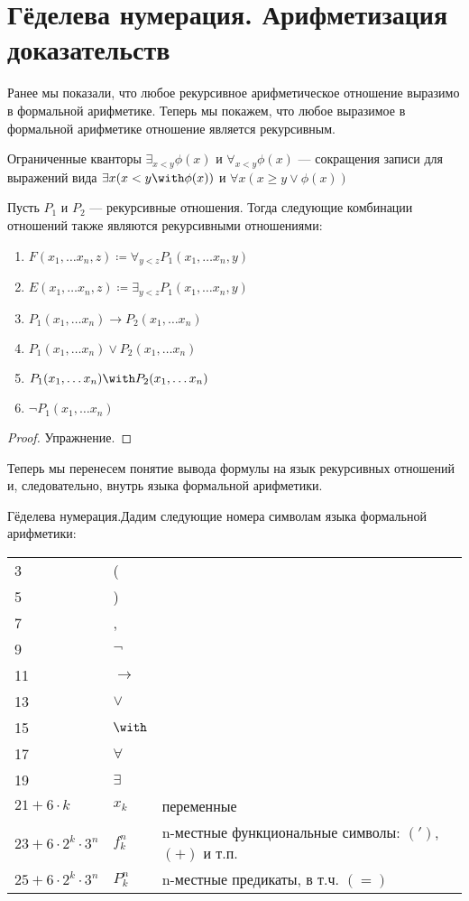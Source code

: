 \section{Гёделева нумерация. Арифметизация доказательств}

Ранее мы показали, что любое рекурсивное арифметическое отношение 
выразимо в формальной арифметике. Теперь мы покажем, что 
любое выразимое в формальной арифметике отношение является рекурсивным.

\begin{definition} Ограниченные кванторы $\exists_{x<y} \phi(x)$ и
$\forall_{x<y} \phi(x)$ --- сокращения записи для выражений вида 
$\exists x (x < y \with \phi(x))$ и $\forall x (x \ge y \vee \phi (x))$
\end{definition}

\begin{theorem}\label{recursive_relation_logic} Пусть $P_1$ и $P_2$ --- рекурсивные отношения.
Тогда следующие комбинации отношений также являются рекурсивными отношениями:

\begin{enumerate}
\item $F(x_1,\dots x_n,z) \coloneqq  \forall_{y<z} P_1(x_1,\dots x_n,y)$
\item $E(x_1, \dots x_n,z) \coloneqq  \exists_{y<z} P_1(x_1,\dots x_n,y)$
\item $P_1(x_1,\dots x_n) \rightarrow P_2(x_1,\dots x_n)$
\item $P_1(x_1,\dots x_n) \vee P_2(x_1,\dots x_n)$
\item $P_1(x_1,\dots x_n) \with P_2(x_1,\dots x_n)$
\item $\neg P_1(x_1, \dots x_n)$
\end{enumerate}
\end{theorem}

\begin{proof}Упражнение.
\end{proof}

Теперь мы перенесем понятие вывода формулы на язык рекурсивных отношений
и, следовательно, внутрь языка формальной арифметики.

\begin{definition}{Гёделева нумерация.}Дадим следующие номера символам языка
формальной арифметики:

\begin{tabular}{lll}
3 & (\\
5 & )\\
7 & ,\\
9 & $\neg$ \\
11 & $\rightarrow$ \\
13 & $\vee$ \\
15 & $\with$ \\
17 & $\forall$ \\
19 & $\exists$ \\
$21 + 6\cdot k$ & $x_k$ & переменные\\
$23 + 6\cdot 2^k \cdot 3^n$ & $f_k^n$ & n-местные функциональные символы: $(')$, $(+)$ и т.п.\\
$25 + 6\cdot 2^k \cdot 3^n$ & $P_k^n$ & n-местные предикаты, в т.ч. $(=)$
\end{tabular}
\end{definition}

